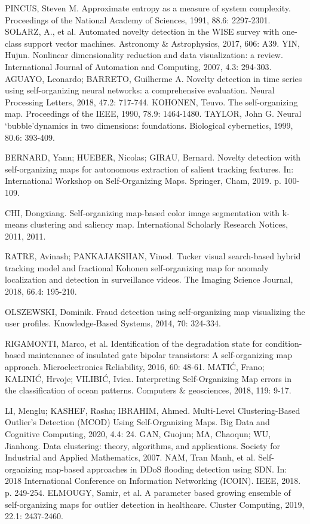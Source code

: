 \documentclass[11pt,twoside,openright]{report}
\begin{document}
\begin{thebibliography}{L}
PINCUS, Steven M. Approximate entropy as a measure of system complexity. Proceedings of the National Academy of Sciences, 1991, 88.6: 2297-2301.
SOLARZ, A., et al. Automated novelty detection in the WISE survey with one-class support vector machines. Astronomy \& Astrophysics, 2017, 606: A39.
YIN, Hujun. Nonlinear dimensionality reduction and data visualization: a review. International Journal of Automation and Computing, 2007, 4.3: 294-303.
AGUAYO, Leonardo; BARRETO, Guilherme A. Novelty detection in time series using self-organizing neural networks: a comprehensive evaluation. Neural Processing Letters, 2018, 47.2: 717-744.
KOHONEN, Teuvo. The self-organizing map. Proceedings of the IEEE, 1990, 78.9: 1464-1480.
TAYLOR, John G. Neural ‘bubble’dynamics in two dimensions: foundations. Biological cybernetics, 1999, 80.6: 393-409.

BERNARD, Yann; HUEBER, Nicolas; GIRAU, Bernard. Novelty detection with self-organizing maps for autonomous extraction of salient tracking features. In: International Workshop on Self-Organizing Maps. Springer, Cham, 2019. p. 100-109.

CHI, Dongxiang. Self-organizing map-based color image segmentation with k-means clustering and saliency map. International Scholarly Research Notices, 2011, 2011.

RATRE, Avinash; PANKAJAKSHAN, Vinod. Tucker visual search-based hybrid tracking model and fractional Kohonen self-organizing map for anomaly localization and detection in surveillance videos. The Imaging Science Journal, 2018, 66.4: 195-210.


OLSZEWSKI, Dominik. Fraud detection using self-organizing map visualizing the user profiles. Knowledge-Based Systems, 2014, 70: 324-334.

RIGAMONTI, Marco, et al. Identification of the degradation state for condition-based maintenance of insulated gate bipolar transistors: A self-organizing map approach. Microelectronics Reliability, 2016, 60: 48-61.
MATIĆ, Frano; KALINIĆ, Hrvoje; VILIBIĆ, Ivica. Interpreting Self-Organizing Map errors in the classification of ocean patterns. Computers \& geosciences, 2018, 119: 9-17.

LI, Menglu; KASHEF, Rasha; IBRAHIM, Ahmed. Multi-Level Clustering-Based Outlier’s Detection (MCOD) Using Self-Organizing Maps. Big Data and Cognitive Computing, 2020, 4.4: 24.
GAN, Guojun; MA, Chaoqun; WU, Jianhong. Data clustering: theory, algorithms, and applications. Society for Industrial and Applied Mathematics, 2007.
NAM, Tran Manh, et al. Self-organizing map-based approaches in DDoS flooding detection using SDN. In: 2018 International Conference on Information Networking (ICOIN). IEEE, 2018. p. 249-254.
ELMOUGY, Samir, et al. A parameter based growing ensemble of self-organizing maps for outlier detection in healthcare. Cluster Computing, 2019, 22.1: 2437-2460.




\end{thebibliography}
\end{document}
